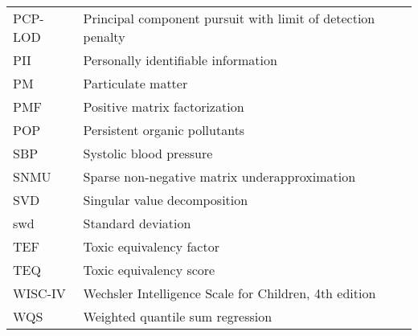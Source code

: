 \begingroup
\renewcommand{\arraystretch}{1.25}
\begin{table}[!ht]
\centering
\begin{tabular}{p{3cm}l}
PCP-LOD & Principal component pursuit with limit of detection penalty \\
PII & Personally identifiable information \\
PM & Particulate matter \\
PMF & Positive matrix factorization   \\
POP & Persistent organic pollutants   \\
SBP & Systolic blood pressure \\
SNMU & Sparse non-negative matrix underapproximation  \\
SVD & Singular value decomposition \\
swd & Standard deviation \\
TEF & Toxic equivalency factor \\
TEQ & Toxic equivalency score \\
WISC-IV & Wechsler Intelligence Scale for Children, 4th edition  \\
WQS & Weighted quantile sum regression \\
\end{tabular}
\end{table}
\endgroup

\clearpage
\makeatletter
\setlength{\@fptop}{0pt plus 1fil}
\setlength{\@fpbot}{0pt plus 1fil}
\makeatother